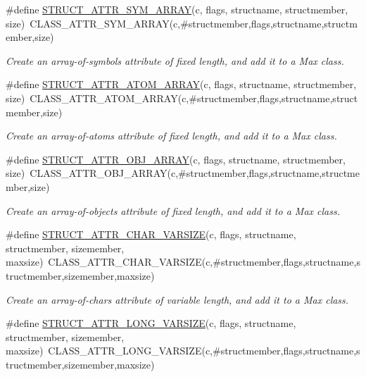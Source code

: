 \begin{DoxyCompactItemize}
\#define \hyperlink{group__attr_ga134802cf096a19aa911dff3c350de6ff}{STRUCT\_\-ATTR\_\-SYM\_\-ARRAY}(c, flags, structname, structmember, size)~CLASS\_\-ATTR\_\-SYM\_\-ARRAY(c,\#structmember,flags,structname,structmember,size)
\begin{DoxyCompactList}\small\item\em Create an array-\/of-\/symbols attribute of fixed length, and add it to a Max class. \item\end{DoxyCompactList}\item 
\#define \hyperlink{group__attr_ga6234cc2c35f969885f4e396eab192ba6}{STRUCT\_\-ATTR\_\-ATOM\_\-ARRAY}(c, flags, structname, structmember, size)~CLASS\_\-ATTR\_\-ATOM\_\-ARRAY(c,\#structmember,flags,structname,structmember,size)
\begin{DoxyCompactList}\small\item\em Create an array-\/of-\/atoms attribute of fixed length, and add it to a Max class. \item\end{DoxyCompactList}\item 
\#define \hyperlink{group__attr_gac90347082cd6484c601e31b0ee43f56e}{STRUCT\_\-ATTR\_\-OBJ\_\-ARRAY}(c, flags, structname, structmember, size)~CLASS\_\-ATTR\_\-OBJ\_\-ARRAY(c,\#structmember,flags,structname,structmember,size)
\begin{DoxyCompactList}\small\item\em Create an array-\/of-\/objects attribute of fixed length, and add it to a Max class. \item\end{DoxyCompactList}\item 
\#define \hyperlink{group__attr_ga05138020c20f81f1ff97bc429906231e}{STRUCT\_\-ATTR\_\-CHAR\_\-VARSIZE}(c, flags, structname, structmember, sizemember, maxsize)~CLASS\_\-ATTR\_\-CHAR\_\-VARSIZE(c,\#structmember,flags,structname,structmember,sizemember,maxsize)
\begin{DoxyCompactList}\small\item\em Create an array-\/of-\/chars attribute of variable length, and add it to a Max class. \item\end{DoxyCompactList}\item 
\#define \hyperlink{group__attr_ga354af4c245f3d634a6ca655149e779e6}{STRUCT\_\-ATTR\_\-LONG\_\-VARSIZE}(c, flags, structname, structmember, sizemember, maxsize)~CLASS\_\-ATTR\_\-LONG\_\-VARSIZE(c,\#structmember,flags,structname,structmember,sizemember,maxsize)

\end{DoxyCompactItemize}
